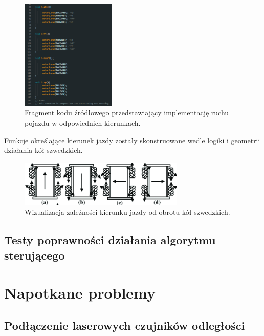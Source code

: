 \documentclass{report}
\begin{document}
\begin{figure}[H]
    \centering
    \includegraphics*[width=0.4\textwidth]{"src/code_snaps/movement_implementation.png"}
    \caption{Fragment kodu źródłowego przedstawiający implementację ruchu pojazdu w odpowiednich kierunkach.}
    \label{fig:sensor_init}
\end{figure}

Funkcje określające kierunek jazdy zostały skonstruowane wedle logiki i geometrii działania kół szwedzkich.

\begin{figure}[H]
    \centering
    \includegraphics*[width=0.7\textwidth]{"src/Robot_pics/Movement.png"}
    \caption{Wizualizacja zależności kierunku jazdy od obrotu kół szwedzkich.}
    \label{fig:sensor_init}
\end{figure}

\subsection{\Large Testy poprawności działania algorytmu sterującego}

%
%

\section{\LARGE Napotkane problemy}
\subsection{\Large Podłączenie laserowych czujników odległości}
%
%
\end{document}
